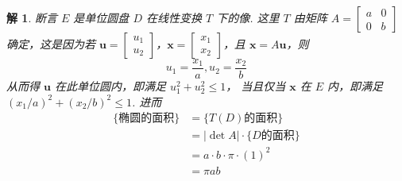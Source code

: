 \documentclass[UTF8,11pt]{ctexart}
\newtheorem*{solution}{解}
\begin{document}
\begin{solution}
    断言 $E$ 是单位圆盘 $D$ 在线性变换 $T$ 下的像. 这里 $T$ 由矩阵 $A = \begin{bmatrix}
        a & 0\\
        0 & b
    \end{bmatrix}$
    确定，这是因为若 $\mathbf{u} = \begin{bmatrix}
        u_1\\
        u_2
    \end{bmatrix}$，$\mathbf{x} = \begin{bmatrix}
        x_1\\
        x_2
    \end{bmatrix}$，且 $\mathbf{x} = A \mathbf{u}$，则
    \[
        u_1 = \frac{x_1}{a} , u_2 = \frac{x_2}{b}
    \]
    \noindent
    从而得 $\mathbf{u}$ 在此单位圆内，即满足 $u^2_1 + u^2_2 \leq 1$，
    当且仅当 $\mathbf{x}$ 在 $E$ 内，即满足 $(x_1/a)^2 + (x_2/b)^2 \leq 1$. 进而
    \noindent
    \begin{align*}  
        \{ \text{椭圆的面积} \} &= \{ T(D) \text{的面积} \}\\
        &= | \det A | \cdot \{ D \text{的面积} \}\\
        &= a \cdot b \cdot \pi \cdot (1)^2\\
        &= \pi a b
    \end{align*}
\end{solution}
\end{document}
